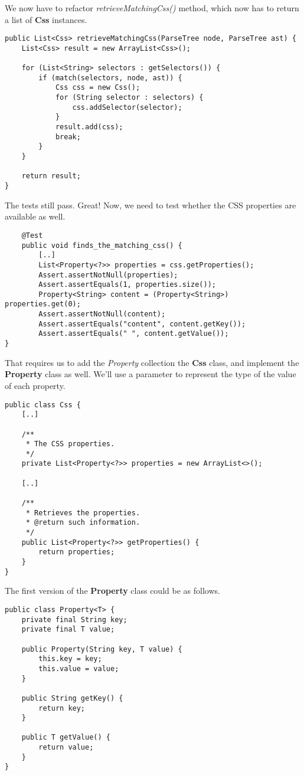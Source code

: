 \documentclass[11pt]{article}
\begin{document}
We now have to refactor \emph{retrieveMatchingCss()} method, which now has to return a list
of \textbf{Css} instances.

\begin{verbatim}
public List<Css> retrieveMatchingCss(ParseTree node, ParseTree ast) {
    List<Css> result = new ArrayList<Css>();

    for (List<String> selectors : getSelectors()) {
        if (match(selectors, node, ast)) {
            Css css = new Css();
            for (String selector : selectors) {
                css.addSelector(selector);
            }
            result.add(css);
            break;
        }
    }

    return result;
}
\end{verbatim}

The tests still pass. Great! Now, we need to test whether the CSS properties are available as well.

\begin{verbatim}
    @Test
    public void finds_the_matching_css() {
        [..]
        List<Property<?>> properties = css.getProperties();
        Assert.assertNotNull(properties);
        Assert.assertEquals(1, properties.size());
        Property<String> content = (Property<String>) properties.get(0);
        Assert.assertNotNull(content);
        Assert.assertEquals("content", content.getKey());
        Assert.assertEquals(" ", content.getValue());
}
\end{verbatim}

That requires us to add the \emph{Property} collection the \textbf{Css} class, and implement the \textbf{Property} class as well.
We'll use a parameter to represent the type of the value of each property.

\begin{verbatim}
public class Css {
    [..]

    /**
     * The CSS properties.
     */
    private List<Property<?>> properties = new ArrayList<>();

    [..]

    /**
     * Retrieves the properties.
     * @return such information.
     */
    public List<Property<?>> getProperties() {
        return properties;
    }
}
\end{verbatim}

The first version of the \textbf{Property} class could be as follows.

\begin{verbatim}
public class Property<T> {
    private final String key;
    private final T value;

    public Property(String key, T value) {
        this.key = key;
        this.value = value;
    }

    public String getKey() {
        return key;
    }

    public T getValue() {
        return value;
    }
}
\end{verbatim}
\end{document}
